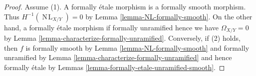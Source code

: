 \documentclass[10pt,a4paper]{amsart}
\theoremstyle{plain}
\theoremstyle{definition}
\theoremstyle{remark}
\numberwithin{equation}{subsection}
\def\NL{\mathop{N\!L}\nolimits}
\begin{document}
\begin{proof}
Assume (1). A formally \'etale morphism is a formally smooth morphism.
Thus $H^{-1}(\NL_{X/Y}) = 0$ by Lemma \ref{lemma-NL-formally-smooth}.
On the other hand, a formally \'etale morphism if formally unramified
hence we have $\Omega_{X/Y} = 0$ by
Lemma \ref{lemma-characterize-formally-unramified}.
Conversely, if (2) holds, then $f$ is formally smooth by
Lemma \ref{lemma-NL-formally-smooth}
and formally unramified by
Lemma \ref{lemma-characterize-formally-unramified}
and hence formally \'etale by
Lemmas \ref{lemma-formally-etale-unramified-smooth}.
\end{proof}
\end{document}
